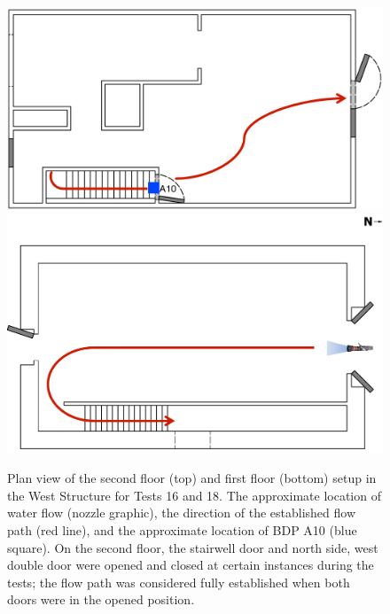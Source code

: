 \documentclass[12pt,oneside]{book}
\begin{document}
\begin{figure}[!ht]
\includegraphics[width=6in]{../Drawings/Specific_Tests/West_Hose_Test_2nd_Floor_Annotated}
\includegraphics[width=6in]{../Drawings/Specific_Tests/West_Hose_Test_18_1st_Floor_Annotated}
\caption[Plan view of the West Structure setup for Tests 16 and 18.]{Plan view of the second floor (top) and first floor (bottom) setup in the West Structure for Tests 16 and 18. The approximate location of water flow (nozzle graphic), the direction of the established flow path (red line), and the approximate location of BDP A10 (blue square). On the second floor, the stairwell door and north side, west double door were opened and closed at certain instances during the tests; the flow path was considered fully established when both doors were in the opened position.}
\label{fig:flow_path_1}
\end{figure}
\end{document}
